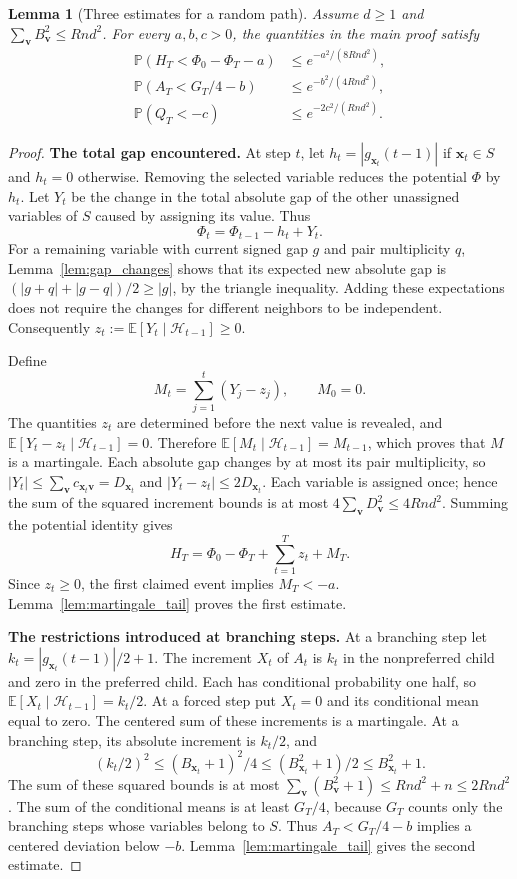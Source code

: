 \documentclass[11pt,a4paper]{article}
\newtheorem{lemma}[theorem]{Lemma}
\theoremstyle{definition}
\theoremstyle{remark}
\newcommand{\E}{\mathbb E}
\newcommand{\Prb}{\mathbb P}
\begin{document}
\begin{lemma}[Three estimates for a random path]\label{lem:bias_probabilities}
Assume $d\ge1$ and $\sum_{\mathbf v}B_{\mathbf v}^2\le Rnd^2$.
For every $a,b,c>0$, the quantities in the main proof satisfy
\begin{align*}
 \Prb(H_T<\Phi_0-\Phi_T-a)&\le e^{-a^2/(8Rnd^2)},\\
 \Prb(A_T<G_T/4-b)&\le e^{-b^2/(4Rnd^2)},\\
 \Prb(Q_T<-c)&\le e^{-2c^2/(Rnd^2)}.
\end{align*}
\end{lemma}
\begin{proof}
\par\medskip\noindent\textbf{The total gap encountered.} 
At step $t$, let $h_t=|g_{\mathbf x_t}(t-1)|$ if $\mathbf x_t\in S$ and
$h_t=0$ otherwise. Removing the selected variable reduces the potential
$\Phi$ by $h_t$. Let $Y_t$ be the change in the total absolute gap of the
other unassigned variables of $S$ caused by assigning its value. Thus
\[
 \Phi_t=\Phi_{t-1}-h_t+Y_t.
\]
For a remaining variable with current signed gap $g$ and pair multiplicity
$q$, Lemma~\ref{lem:gap_changes} shows that its expected new absolute gap is
$(|g+q|+|g-q|)/2\ge|g|$, by the triangle inequality.
Adding these expectations does not require the changes for different
neighbors to be independent. Consequently
$z_t:=\E[Y_t\mid\mathcal H_{t-1}]\ge0$.

Define
\[
 M_t=\sum_{j=1}^t(Y_j-z_j),\qquad M_0=0.
\]
The quantities $z_t$ are determined before the next value is revealed, and
$\E[Y_t-z_t\mid\mathcal H_{t-1}]=0$. Therefore
$\E[M_t\mid\mathcal H_{t-1}]=M_{t-1}$, which proves that $M$ is a martingale.
Each absolute gap changes by at most its pair multiplicity, so
$|Y_t|\le\sum_{\mathbf v}c_{\mathbf x_t\mathbf v}=D_{\mathbf x_t}$ and
$|Y_t-z_t|\le2D_{\mathbf x_t}$. Each variable is assigned once; hence
the sum of the squared increment bounds is at most
$4\sum_{\mathbf v}D_{\mathbf v}^2\le4Rnd^2$.
Summing the potential identity gives
\[
 H_T=\Phi_0-\Phi_T+\sum_{t=1}^Tz_t+M_T.
\]
Since $z_t\ge0$, the first claimed event implies $M_T<-a$.
Lemma~\ref{lem:martingale_tail} proves the first estimate.

\par\medskip\noindent\textbf{The restrictions introduced at branching steps.} 
At a branching step let $k_t=|g_{\mathbf x_t}(t-1)|/2+1$.
The increment $X_t$ of $A_t$ is $k_t$ in the nonpreferred child and zero
in the preferred child. Each has conditional probability one half, so
$\E[X_t\mid\mathcal H_{t-1}]=k_t/2$.
At a forced step put $X_t=0$ and its conditional mean equal to zero.
The centered sum of these increments is a martingale. At a branching step,
its absolute increment is $k_t/2$, and
\[
 (k_t/2)^2\le(B_{\mathbf x_t}+1)^2/4
       \le(B_{\mathbf x_t}^2+1)/2
       \le B_{\mathbf x_t}^2+1.
\]
The sum of these squared bounds is at most
$\sum_{\mathbf v}(B_{\mathbf v}^2+1)\le Rnd^2+n\le2Rnd^2$.
The sum of the conditional means is at least $G_T/4$, because $G_T$
counts only the branching steps whose variables belong to $S$.
Thus $A_T<G_T/4-b$ implies a centered deviation below $-b$.
Lemma~\ref{lem:martingale_tail} gives the second estimate.


\end{proof}
\end{document}

